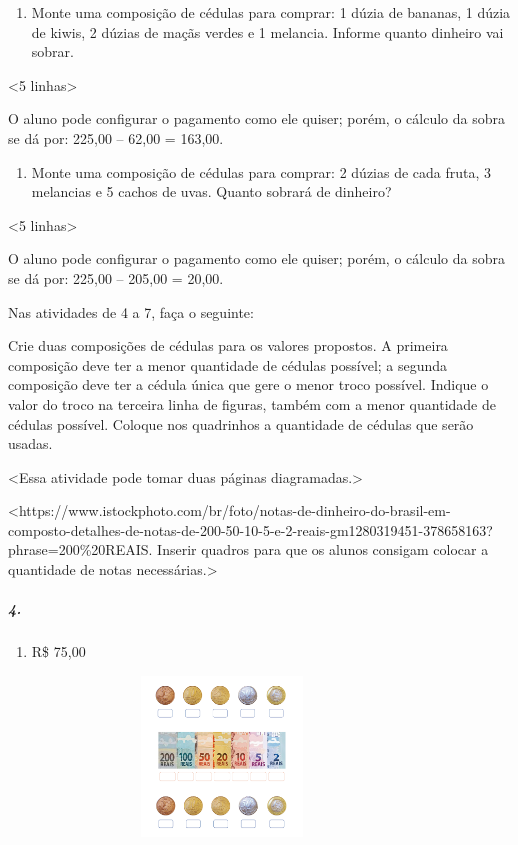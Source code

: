 \begin{enumerate}
\def\labelenumi{\alph{enumi})}
\item
  Monte uma composição de cédulas para comprar: 1 dúzia de bananas, 1
  dúzia de kiwis, 2 dúzias de maçãs verdes e 1 melancia. Informe quanto
  dinheiro vai sobrar.
\end{enumerate}

\textless{}5 linhas\textgreater{}

O aluno pode configurar o pagamento como ele quiser; porém, o cálculo da
sobra se dá por: 225,00 -- 62,00 = 163,00.

\begin{enumerate}
\def\labelenumi{\alph{enumi})}
\item
  Monte uma composição de cédulas para comprar: 2 dúzias de cada fruta,
  3 melancias e 5 cachos de uvas. Quanto sobrará de dinheiro?
\end{enumerate}

\textless{}5 linhas\textgreater{}

O aluno pode configurar o pagamento como ele quiser; porém, o cálculo da
sobra se dá por: 225,00 -- 205,00 = 20,00.

Nas atividades de 4 a 7, faça o seguinte:

Crie duas composições de cédulas para os valores propostos. A primeira composição deve ter a menor quantidade de cédulas possível; a segunda
composição deve ter a cédula única que gere o menor troco possível.
Indique o valor do troco na terceira linha de figuras, também com a
menor quantidade de cédulas possível. Coloque nos quadrinhos a
quantidade de cédulas que serão usadas. 

\textless{}Essa atividade pode
tomar duas páginas diagramadas.\textgreater{}

\textless{}https://www.istockphoto.com/br/foto/notas-de-dinheiro-do-brasil-em-composto-detalhes-de-notas-de-200-50-10-5-e-2-reais-gm1280319451-378658163?phrase=200\%20REAIS.
Inserir quadros para que os alunos consigam colocar a quantidade de
notas necessárias.\textgreater{}

\subparagraph{4.}\label{section-60}


\begin{enumerate}
\def\labelenumi{\alph{enumi})}
\item
  R\$ 75,00
\end{enumerate}

\includegraphics[width=4.45833in,height=1.68116in]{media/image72.png}


